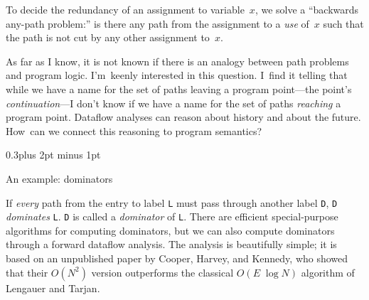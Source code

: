 \documentclass[twocolumn]{article}
\makeatletter
\newcommand\mysection[1]{%
  \par
  \vskip 0.5\baselineskip plus 2pt minus 1pt
  \noindent{\raggedright\textbf{#1}}
  \par
  \vskip 0.3\baselineskip plus 2pt minus 1pt
  \@afterindentfalse
}
\renewcommand\mysection[1]{%
  \@startsection{section}{1}{\z@}{-0.5\baselineskip plus -2pt minus -1pt}%
                                   {0.3\baselineskip plus 2pt minus 1pt}%
           {\normalfont\raggedright\bfseries}}
\makeatother
\begin{document}
To decide the redundancy of an assignment to variable~$x$, we solve a ``backwards
any-path problem:'' is there any path from the assignment to a
\emph{use} of~$x$ such that the path is not cut by any other
assignment to~$x$.

As far as I know, it is not known if there is an analogy between path
problems and program logic.
I'm~keenly interested in this question.
I~find it telling that while we have a name for the set of paths
leaving a program 
point---the point's \emph{continuation}---I don't know if we have a name
for the set of paths \emph{reaching} a program point.
Dataflow analyses can reason about history and about the future.
How~can we connect this reasoning to program semantics?


\mysection*{An example: dominators}

If \emph{every} path from the entry to
label \texttt{L} must pass through another label \texttt{D},
\texttt{D} \emph{dominates} \texttt{L}.
\texttt{D} is called a \emph{dominator} of \texttt{L}.
There are efficient special-purpose
algorithms for computing dominators, but we can also compute
dominators through a forward dataflow analysis.
The analysis is beautifully simple; it is based on an unpublished
paper by Cooper, Harvey, and Kennedy, who showed that their $O(N^2)$ version
outperforms the classical $O(E\;\log N)$ algorithm of Lengauer and
Tarjan.
\end{document}

